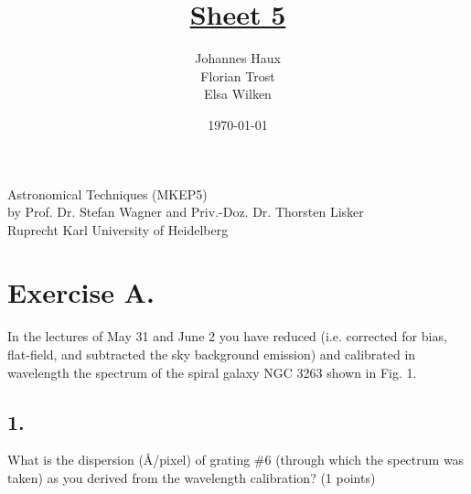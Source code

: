 \documentclass[11pt,a4paper,twoside]{article}
\title{\LARGE \underline {Sheet 5}}
\author{Johannes Haux \\ Florian Trost \\ Elsa Wilken}
\date{\today}
\begin{document}
\maketitle
\thispagestyle{empty}

\begin{center}
  Astronomical Techniques (MKEP5) \\
  \baselineskip35pt
  by Prof. Dr. Stefan Wagner and Priv.-Doz. Dr. Thorsten Lisker \\
  \baselineskip60pt
  Ruprecht Karl University of Heidelberg
\vskip 40pt

\end{center}

\newpage
\setcounter{page}{1}		%
\section*{Exercise A.}
In the lectures of May 31 and June 2 you have reduced (i.e. corrected for
bias, flat-field, and subtracted the sky background emission) and calibrated in wavelength
the spectrum of the spiral galaxy NGC 3263 shown in Fig. 1.\\
\subsection*{1.} What is the dispersion (\AA/pixel) of grating \#6 (through which the spectrum was taken) as
you derived from the wavelength calibration? (1 points)
\end{document}
